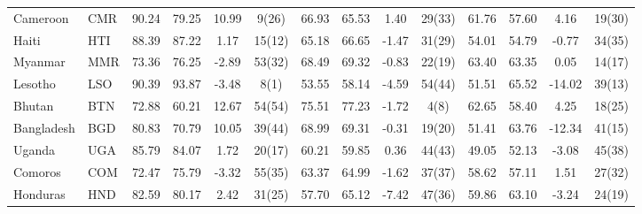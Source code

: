 \begin{longtable}{m{2.4cm}lcccc|cccc|cccc}
Cameroon                          & CMR           & 90.24            & 79.25              & 10.99            & 9(26)            & 66.93    & 65.53      & 1.40     & 29(33)   & 61.76           & 57.60             & 4.16            & 19(30)          \\
Haiti                             & HTI           & 88.39            & 87.22              & 1.17             & 15(12)           & 65.18    & 66.65      & -1.47    & 31(29)   & 54.01           & 54.79             & -0.77           & 34(35)          \\
Myanmar                           & MMR           & 73.36            & 76.25              & -2.89            & 53(32)           & 68.49    & 69.32      & -0.83    & 22(19)   & 63.40           & 63.35             & 0.05            & 14(17)          \\
Lesotho                           & LSO           & 90.39            & 93.87              & -3.48            & 8(1)             & 53.55    & 58.14      & -4.59    & 54(44)   & 51.51           & 65.52             & -14.02          & 39(13)          \\
Bhutan                            & BTN           & 72.88            & 60.21              & 12.67            & 54(54)           & 75.51    & 77.23      & -1.72    & 4(8)     & 62.65           & 58.40             & 4.25            & 18(25)          \\
Bangladesh                        & BGD           & 80.83            & 70.79              & 10.05            & 39(44)           & 68.99    & 69.31      & -0.31    & 19(20)   & 51.41           & 63.76             & -12.34          & 41(15)          \\
Uganda                            & UGA           & 85.79            & 84.07              & 1.72             & 20(17)           & 60.21    & 59.85      & 0.36     & 44(43)   & 49.05           & 52.13             & -3.08           & 45(38)          \\
Comoros                           & COM           & 72.47            & 75.79              & -3.32            & 55(35)           & 63.37    & 64.99      & -1.62    & 37(37)   & 58.62           & 57.11             & 1.51            & 27(32)          \\
Honduras                          & HND           & 82.59            & 80.17              & 2.42             & 31(25)           & 57.70    & 65.12      & -7.42    & 47(36)   & 59.86           & 63.10             & -3.24           & 24(19)          \\

\end{longtable}
